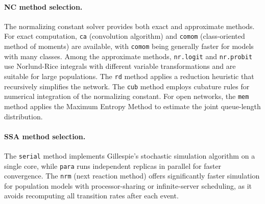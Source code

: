 \paragraph{NC method selection.}
The normalizing constant solver provides both exact and approximate methods. For exact computation, \texttt{ca} (convolution algorithm) and \texttt{comom} (class-oriented method of moments) are available, with \texttt{comom} being generally faster for models with many classes. Among the approximate methods, \texttt{nr.logit} and \texttt{nr.probit} use Norlund-Rice integrals with different variable transformations and are suitable for large populations. The \texttt{rd} method applies a reduction heuristic that recursively simplifies the network. The \texttt{cub} method employs cubature rules for numerical integration of the normalizing constant. For open networks, the \texttt{mem} method applies the Maximum Entropy Method to estimate the joint queue-length distribution.

\paragraph{SSA method selection.}
The \texttt{serial} method implements Gillespie's stochastic simulation algorithm on a single core, while \texttt{para} runs independent replicas in parallel for faster convergence. The \texttt{nrm} (next reaction method) offers significantly faster simulation for population models with processor-sharing or infinite-server scheduling, as it avoids recomputing all transition rates after each event.
